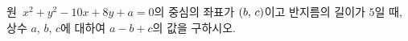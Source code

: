 원~$x^2+y^2-10x+8y+a=0$의 중심의 좌표가 $(b,\mkern3mu c)$이고 반지름의 길이가 $5$일 때, 상수 $a$, $b$, $c$에 대하여 $a-b+c$의 값을 구하시오.
